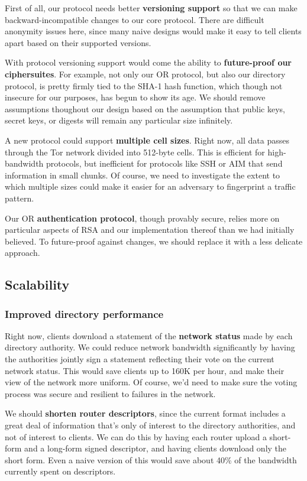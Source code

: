\documentclass{article}
\begin{document}
First of all, our protocol needs better {\bf versioning support} so that we
can make backward-incompatible changes to our core protocol.  There are
difficult anonymity issues here, since many naive designs would make it easy
to tell clients apart based on their supported versions.

With protocol versioning support would come the ability to {\bf future-proof
  our ciphersuites}.  For example, not only our OR protocol, but also our
directory protocol, is pretty firmly tied to the SHA-1 hash function, which
though not insecure for our purposes, has begun to show its age.  We should
remove assumptions thoughout our design based on the assumption that public
keys, secret keys, or digests will remain any particular size infinitely.

A new protocol could support {\bf multiple cell sizes}.  Right now, all data
passes through the Tor network divided into 512-byte cells.  This is
efficient for high-bandwidth protocols, but inefficient for protocols
like SSH or AIM that send information in small chunks.  Of course, we need to
investigate the extent to which multiple sizes could make it easier for an
adversary to fingerprint a traffic pattern.

Our OR {\bf authentication protocol}, though provably
secure\cite{goldberg-tap}, relies more on particular aspects of RSA and our
implementation thereof than we had initially believed.  To future-proof
against changes, we should replace it with a less delicate approach.

\subsection{Scalability}

\subsubsection{Improved directory performance}
Right now, clients download a statement of the {\bf network status} made by
each directory authority.  We could reduce network bandwidth significantly by
having the authorities jointly sign a statement reflecting their vote on the
current network status.  This would save clients up to 160K per hour, and
make their view of the network more uniform.  Of course, we'd need to make
sure the voting process was secure and resilient to failures in the network.

We should {\bf shorten router descriptors}, since the current format includes
a great deal of information that's only of interest to the directory
authorities, and not of interest to clients.  We can do this by having each
router upload a short-form and a long-form signed descriptor, and having
clients download only the short form.  Even a naive version of this would
save about 40\% of the bandwidth currently spent on descriptors.
\end{document}
